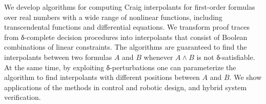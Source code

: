 We develop algorithms for computing Craig interpolants for first-order formulas over real numbers with a wide range of nonlinear functions, including transcendental functions and differential equations.
We transform proof traces from δ-complete decision procedures into interpolants that consist of Boolean combinations of linear constraints.
The algorithms are guaranteed to find the interpolants between two formulas $A$ and $B$ whenever $A ∧ B$ is not δ-satisfiable.
At the same time, by exploiting δ-perturbations one can parameterize the algorithm to find interpolants with different positions between $A$ and $B$.
We show applications of the methods in control and robotic design, and hybrid system verification.  
